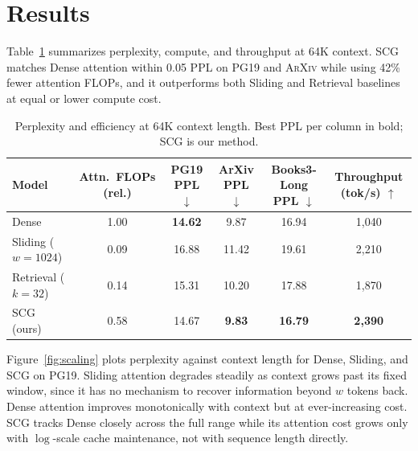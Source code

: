 \section{Results}
\label{sec:results}

Table~\ref{tab:results} summarizes perplexity, compute, and throughput at 64K
context. SCG matches Dense attention within 0.05 PPL on \textsc{PG19} and
\textsc{ArXiv} while using 42\% fewer attention FLOPs, and it outperforms
both Sliding and Retrieval baselines at equal or lower compute cost.

\begin{table}[t]
\centering
\small
\caption{Perplexity and efficiency at 64K context length. Best PPL per column in bold; SCG is our method.}
\label{tab:results}
\begin{tabular}{lccccc}
\toprule
Model & Attn.\ FLOPs (rel.) & PG19 PPL $\downarrow$ & ArXiv PPL $\downarrow$ & Books3-Long PPL $\downarrow$ & Throughput (tok/s) $\uparrow$ \\
\midrule
Dense               & 1.00 & \textbf{14.62} & 9.87  & 16.94 & 1{,}040 \\
Sliding ($w{=}1024$) & 0.09 & 16.88          & 11.42 & 19.61 & 2{,}210 \\
Retrieval ($k{=}32$) & 0.14 & 15.31          & 10.20 & 17.88 & 1{,}870 \\
\rowcolor{colmlight}
SCG (ours)           & 0.58 & 14.67          & \textbf{9.83} & \textbf{16.79} & \textbf{2{,}390} \\
\bottomrule
\end{tabular}
\end{table}

Figure~\ref{fig:scaling} plots perplexity against context length for Dense,
Sliding, and SCG on \textsc{PG19}. Sliding attention degrades steadily as
context grows past its fixed window, since it has no mechanism to recover
information beyond $w$ tokens back. Dense attention improves monotonically
with context but at ever-increasing cost. SCG tracks Dense closely across
the full range while its attention cost grows only with $\log$-scale cache
maintenance, not with sequence length directly.

